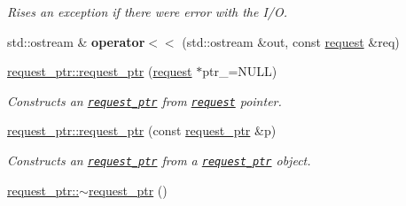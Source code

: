 \begin{CompactItemize}
\begin{CompactList}\small\item\em Rises an exception if there were error with the I/O. \item\end{CompactList}\item 
\hypertarget{group__iolayer_gc3aee281e5866a4676de6fe9c5f898ef}{
std::ostream \& \textbf{operator$<$$<$} (std::ostream \&out, const \hyperlink{classrequest}{request} \&req)}
\label{group__iolayer_gc3aee281e5866a4676de6fe9c5f898ef}

\item 
\hypertarget{group__iolayer_ge78ff55c792061dae60eebda7b08615a}{
\hyperlink{group__iolayer_ge78ff55c792061dae60eebda7b08615a}{request\_\-ptr::request\_\-ptr} (\hyperlink{classrequest}{request} $\ast$ptr\_\-=NULL)}
\label{group__iolayer_ge78ff55c792061dae60eebda7b08615a}

\begin{CompactList}\small\item\em Constructs an {\tt \hyperlink{classrequest__ptr}{request\_\-ptr}} from {\tt \hyperlink{classrequest}{request}} pointer. \item\end{CompactList}\item 
\hypertarget{group__iolayer_gfbd62f3bb0fe9378ffe9defd6be764dc}{
\hyperlink{group__iolayer_gfbd62f3bb0fe9378ffe9defd6be764dc}{request\_\-ptr::request\_\-ptr} (const \hyperlink{classrequest__ptr}{request\_\-ptr} \&p)}
\label{group__iolayer_gfbd62f3bb0fe9378ffe9defd6be764dc}

\begin{CompactList}\small\item\em Constructs an {\tt \hyperlink{classrequest__ptr}{request\_\-ptr}} from a {\tt \hyperlink{classrequest__ptr}{request\_\-ptr}} object. \item\end{CompactList}\item 
\hypertarget{group__iolayer_g3dd322205e1e61403b2d14874a543ab4}{
\hyperlink{group__iolayer_g3dd322205e1e61403b2d14874a543ab4}{request\_\-ptr::$\sim$request\_\-ptr} ()}
\label{group__iolayer_g3dd322205e1e61403b2d14874a543ab4}


\end{CompactItemize}
